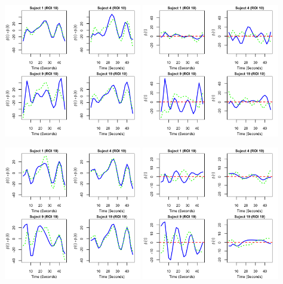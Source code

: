 \includegraphics[width=0.45\textwidth]{ROI10_sub4_betat.png}
\includegraphics[width=0.45\textwidth]{ROI10_sub4_betait.png}

\includegraphics[width=0.45\textwidth]{ROI19_sub4_betat.png}
\includegraphics[width=0.45\textwidth]{ROI19_sub4_betait.png}

